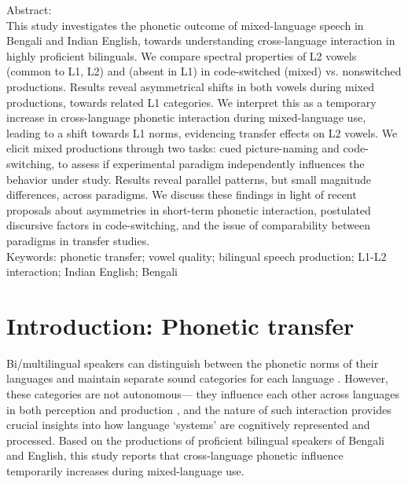 \documentclass[12 pt]{article}
\newcommand{\nt}[1]{\textipa{[#1]}} %
\newlength\mystoreparindent
\newenvironment{myparindent}[1]{%
	\setlength{\mystoreparindent}{\the\parindent}
	\setlength{\parindent}{#1}
}{%
	\setlength{\parindent}{\mystoreparindent}
}
\begin{document}
\newpage
\begin{myparindent}{0pt}
Abstract:\\
This study investigates the phonetic outcome of mixed-language speech in Bengali and Indian English, towards understanding cross-language interaction in highly proficient bilinguals.  We compare spectral properties of L2 vowels \nt{\ae} (common to L1, L2) and \nt{2} (absent in L1) in code-switched (mixed) vs. nonswitched productions. Results reveal asymmetrical shifts in both vowels during mixed productions, towards related L1 categories. We interpret this as a temporary increase in cross-language phonetic interaction during mixed-language use, leading to a shift towards L1 norms, evidencing transfer effects on L2 vowels. We elicit mixed productions through two tasks: cued picture-naming and code-switching, to assess if experimental paradigm independently influences the behavior under study. Results reveal parallel patterns, but small magnitude differences, across paradigms. We discuss these findings in light of recent proposals about asymmetries in short-term phonetic interaction, postulated discursive factors in code-switching, and the issue of comparability between paradigms in transfer studies. \\


Keywords: phonetic transfer; vowel quality; bilingual speech production; L1-L2 interaction; Indian English; Bengali 

\end{myparindent}

\newpage

\section{Introduction: Phonetic transfer}\label{introduction}

Bi/multilingual speakers can distinguish between the phonetic norms of their languages and maintain separate sound categories for each language \citep{caramazza1973acquisition,macleod2010impact,bosch2003simultaneous}. However, these categories are not autonomous--- they influence each other across languages in both perception and production \citep[e.g.][]{flege1995second,fowler2008cross,flege2002assessing}, and the nature of such interaction provides crucial insights into how language `systems' are cognitively represented and processed. Based on the productions of proficient bilingual speakers of Bengali and English, this study reports that cross-language phonetic influence temporarily increases during mixed-language use.%
\end{document}
